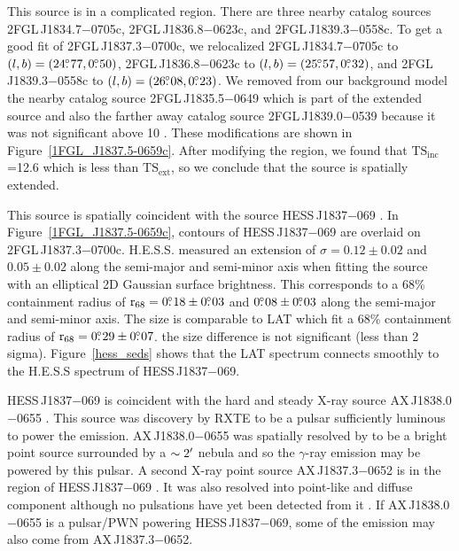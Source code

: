 \documentclass[12pt,preprint]{aastex}
\newcommand{\gev}{\text{GeV}\xspace}
\newcommand{\tev}{\text{TeV}\xspace}
\newcommand{\tsext}{{\ensuremath{\text{TS}_{\text{ext}}}}\xspace}
\newcommand{\tsinc}{\ensuremath{\text{TS}_{\text{inc}}}\xspace}
\newcommand{\chandra}{\text{{\em Chandra}}\xspace}
\newcommand{\rsixeight}{{\ensuremath{\text{r}_{68}}}\xspace}
\newcommand{\hl}[1]{#1}
\begin{document}
This source is in a complicated region. There are three nearby
catalog sources 2FGL\,J1834.7$-$0705c, 2FGL\,J1836.8$-$0623c, and
2FGL\,J1839.3$-$0558c.  To get a good fit of 2FGL\,J1837.3$-$0700c, we
relocalized 2FGL\,J1834.7$-$0705c to $(l,b)=(24\mbox{$.\!\!^\circ$}77,0\mbox{$.\!\!^\circ$}50)$,
2FGL\,J1836.8$-$0623c to $(l,b)=(25\mbox{$.\!\!^\circ$}57,0\mbox{$.\!\!^\circ$}32)$, and
2FGL\,J1839.3$-$0558c to $(l,b)=(26\mbox{$.\!\!^\circ$}08,0\mbox{$.\!\!^\circ$}23)$.  We removed from
our background model the
nearby catalog source 2FGL\,J1835.5$-$0649 which is part of the extended
source and also the farther away catalog source 2FGL\,J1839.0$-$0539
because it was not significant above 10 \gev. These modifications are
shown in Figure~\ref{1FGL_J1837.5-0659c}.  After modifying the region,
we found that \tsinc=12.6 which is less than \tsext, so we conclude that
the source is spatially extended.

This source is spatially coincident with the \tev source HESS\,J1837$-$069
\citep{hess_plane_survey}.  In Figure~\ref{1FGL_J1837.5-0659c}, contours
of HESS\,J1837$-$069 are overlaid on 2FGL\,J1837.3$-$0700c. H.E.S.S. measured
an extension of $\sigma=0.12\pm0.02$ and $0.05\pm0.02$
along the semi-major and semi-minor axis when fitting the source
with an elliptical 2D Gaussian surface brightness.  This corresponds
to a 68\% containment radius of $\rsixeight=0\fdg18\pm0\fdg03$ and
$0\mbox{$.\!\!^\circ$}08\pm0\mbox{$.\!\!^\circ$}03$ along the semi-major and semi-minor axis. The
size is comparable to LAT which fit a 68\% containment radius of
$\rsixeight=0\fdg29\pm0\fdg07$.  the size difference is not significant
(less than 2 sigma).  Figure~\ref{hess_seds} shows that the LAT spectrum
connects smoothly to the H.E.S.S spectrum of HESS\,J1837$-$069.

\hl{
HESS\,J1837$-$069 is coincident
with the hard and steady X-ray source AX\,J1838.0$-$0655
\citep{einstein_galactic_plane_survey,hard_x-ray_asca,integral_AX_J1838.0-0655,swift_follow_up,pulsations_HESS_J1837-069,suzaku_HESS_J1837-069}.
This source was discovery by RXTE to be a pulsar sufficiently
luminous to power the \tev emission.  AX\,J1838.0$-$0655 was spatially
resolved by \chandra to be a bright point source surrounded by
a $\sim2\mbox{$^\prime$}$ nebula \citep{pulsations_HESS_J1837-069} and so the
$\gamma$-ray emission may be powered by this pulsar.  A second
X-ray point source AX\,J1837.3$-$0652 is in the region of HESS\,J1837$-$069
\citep{hard_x-ray_asca,swift_follow_up,pulsations_HESS_J1837-069,suzaku_HESS_J1837-069}.
It was also resolved into point-like and diffuse component
although no pulsations have yet been detected from it
\citep{pulsations_HESS_J1837-069}.  If AX\,J1838.0$-$0655 is a pulsar/PWN
powering HESS\,J1837$-$069, some of the \tev emission may also come from
AX\,J1837.3$-$0652.
}
\end{document}
